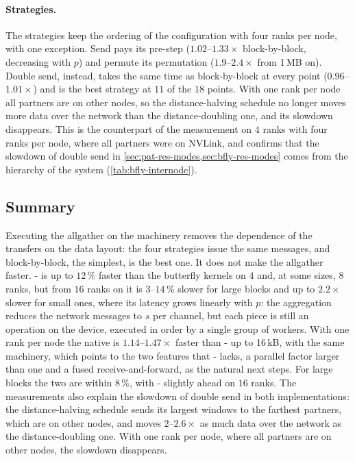 \paragraph{Strategies.}
The strategies keep the ordering of the configuration with four ranks per node, with one exception.
Send pays its pre-step ($1.02$--$1.33\times$ block-by-block, decreasing with $p$) and permute its permutation ($1.9$--$2.4\times$ from 1\,MB on).
Double send, instead, takes the same time as block-by-block at every point ($0.96$--$1.01\times$) and is the best strategy at $11$ of the $18$ points.
With one rank per node all partners are on other nodes, so the distance-halving schedule no longer moves more data over the network than the distance-doubling one, and its slowdown disappears.
This is the counterpart of the measurement on $4$ ranks with four ranks per node, where all partners were on NVLink, and confirms that the slowdown of double send in \cref{sec:pat-res-modes,sec:bfly-res-modes} comes from the hierarchy of the system (\cref{tab:bfly-internode}).

\subsection{Summary}

Executing the \bine{} allgather on the \pat{} machinery removes the dependence of the transfers on the data layout: the four strategies issue the same messages, and block-by-block, the simplest, is the best one.
It does not make the allgather faster.
\bine{}-\pat{} is up to $12\,\%$ faster than the butterfly kernels on $4$ and, at some sizes, $8$ ranks, but from $16$ ranks on it is $3$--$14\,\%$ slower for large blocks and up to $2.2\times$ slower for small ones, where its latency grows linearly with $p$: the aggregation reduces the network messages to $s$ per channel, but each piece is still an operation on the device, executed in order by a single group of workers.
With one rank per node the native \pat{} is $1.14$--$1.47\times$ faster than \bine{}-\pat{} up to 16\,kB, with the same machinery, which points to the two features that \bine{}-\pat{} lacks, a parallel factor larger than one and a fused receive-and-forward, as the natural next steps. For large blocks the two are within $8\,\%$, with \bine{}-\pat{} slightly ahead on $16$ ranks.
The measurements also explain the slowdown of double send in both implementations: the distance-halving schedule sends its largest windows to the farthest partners, which are on other nodes, and moves $2$--$2.6\times$ as much data over the network as the distance-doubling one. With one rank per node, where all partners are on other nodes, the slowdown disappears.
